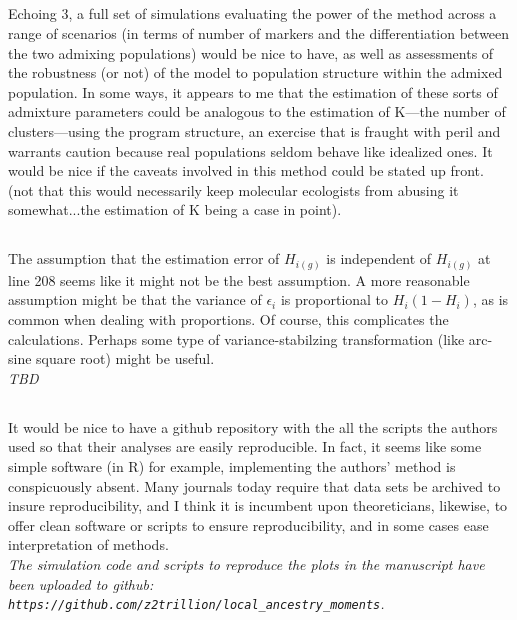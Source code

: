 \documentclass[11pt]{amsart}
\begin{document}
\subsection{}
Echoing 3, a full set of simulations evaluating the power of the
method across a range of scenarios (in terms of number of markers and the
differentiation between the two admixing populations) would be nice to have, as
well as assessments of the robustness (or not) of the model to population
structure within the admixed population. In some ways, it appears to me that the
estimation of these sorts of admixture parameters could be analogous to the
estimation of K---the number of clusters---using the program structure, an
exercise that is fraught with peril and warrants caution because real
populations seldom behave like idealized ones. It would be nice if the caveats
involved in this method could be stated up front. (not that this would
necessarily keep molecular ecologists from abusing it somewhat...the estimation
of K being a case in point).\\
\textit{
}

\subsection{}
The assumption that the estimation error of $H_{i(g)}$ is
independent of $H_{i(g)}$ at line 208 seems like it might not be the best
assumption. A more reasonable assumption might be that the variance of
$\epsilon_i$ is proportional to $H_i(1-H_i)$, as is common when dealing with
proportions. Of course, this complicates the calculations. Perhaps some type of
variance-stabilzing transformation (like arc-sine square root) might be
useful.\\
\textit{
	TBD
}

\subsection{}
It would be nice to have a github repository with the all the
scripts the authors used so that their analyses are easily reproducible. In
fact, it seems like some simple software (in R) for example, implementing the
authors' method is conspicuously absent. Many journals today require that data
sets be archived to insure reproducibility, and I think it is incumbent upon
theoreticians, likewise, to offer clean software or scripts to ensure
reproducibility, and in some cases ease interpretation of methods.\\
\textit{The
simulation code and scripts to reproduce the plots in the manuscript have been
uploaded to github:
\texttt{https://github.com/z2trillion/local\_ancestry\_moments}.}
\end{document}

